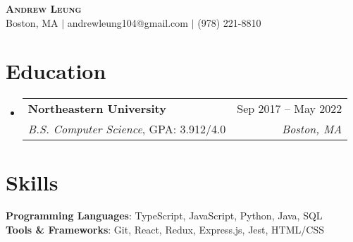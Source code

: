 \documentclass[letterpaper, 11pt]{article}
\makeatletter
\newcommand{\educationSubHeading}[5]{
  \vspace{-2pt}\item
    \begin{tabular*}{0.97\textwidth}[t]{l@{\extracolsep{\fill}}r}
      \textbf{#1} & #2 \\
     \textit{\small#3}, \small#4 & \textit{\small#5} \\
    \end{tabular*}\vspace{-7pt}
}
\newcommand{\resumeSubHeadingListStart}{\begin{itemize}[leftmargin=0.15in, label={}]}
\newcommand{\resumeSubHeadingListEnd}{\end{itemize}}
\makeatother
\begin{document}
 
  
\begin{center}
    \textbf{\Large \scshape Andrew Leung} \\ \vspace{1.5pt}
    \small Boston, MA $|$ andrewleung104@gmail.com $|$ (978) 221-8810\\
\end{center}
\vspace{-15pt}  
  
\section{Education}
  \resumeSubHeadingListStart
    \educationSubHeading
      {Northeastern University}{Sep 2017 -- May 2022}
      {B.S. Computer Science}{GPA: 3.912/4.0}{Boston, MA}
     \vspace{-5pt}
  \resumeSubHeadingListEnd  
  
\section{Skills}
    \begin{itemize}[leftmargin=0.15in, label={}]
        \small{\item{
            \textbf{Programming Languages}{: TypeScript, JavaScript, Python, Java, SQL}\\
            \textbf{Tools \& Frameworks}{: Git, React, Redux, Express.js, Jest, HTML/CSS}\\
        }}
\end{itemize}  
  
\end{document}
